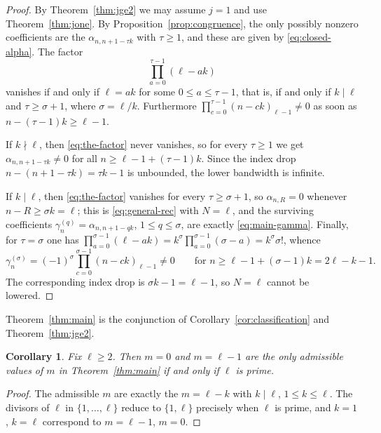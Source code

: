 \documentclass{amsart}
\newtheorem{corollary}[theorem]{Corollary}
\theoremstyle{definition}
\newcommand{\fall}[2]{(#1)_{#2}}
\begin{document}
\begin{proof}
By Theorem~\ref{thm:jge2} we may assume \(j=1\) and use
Theorem~\ref{thm:jone}.  By Proposition~\ref{prop:congruence}, the only
possibly nonzero coefficients are the \(\alpha_{n,n+1-\tau k}\) with
\(\tau\ge1\), and these are given by \eqref{eq:closed-alpha}.  The factor
\begin{equation}\label{eq:the-factor}
\prod_{a=0}^{\tau-1}(\ell-ak)
\end{equation}
vanishes if and only if \(\ell=ak\) for some \(0\le a\le\tau-1\), that is,
if and only if \(k\mid\ell\) and \(\tau\ge\sigma+1\), where
\(\sigma=\ell/k\).  Furthermore
\(\prod_{c=0}^{\tau-1}\fall{n-ck}{\ell-1}\ne0\) as soon as
\(n-(\tau-1)k\ge\ell-1\).

If \(k\nmid\ell\), then \eqref{eq:the-factor} never vanishes, so for every
\(\tau\ge1\) we get \(\alpha_{n,n+1-\tau k}\ne0\) for all
\(n\ge\ell-1+(\tau-1)k\).  Since the index drop \(n-(n+1-\tau k)=\tau k-1\)
is unbounded, the lower bandwidth is infinite.

If \(k\mid\ell\), then \eqref{eq:the-factor} vanishes for every
\(\tau\ge\sigma+1\), so \(\alpha_{n,R}=0\) whenever
\(n-R\ge\sigma k=\ell\); this is \eqref{eq:general-rec} with \(N=\ell\), and
the surviving coefficients \(\gamma^{(q)}_n=\alpha_{n,n+1-qk}\),
\(1\le q\le\sigma\), are exactly \eqref{eq:main-gamma}.  Finally, for
\(\tau=\sigma\) one has
\(\prod_{a=0}^{\sigma-1}(\ell-ak)=k^\sigma\prod_{a=0}^{\sigma-1}(\sigma-a)
=k^\sigma\sigma!\), whence
\[
\gamma_n^{(\sigma)}
=(-1)^\sigma\prod_{c=0}^{\sigma-1}\fall{n-ck}{\ell-1}\ne0
\qquad\text{for } n\ge\ell-1+(\sigma-1)k=2\ell-k-1 .
\]
The corresponding index drop is \(\sigma k-1=\ell-1\), so \(N=\ell\) cannot
be lowered.
\end{proof}

Theorem~\ref{thm:main} is the conjunction of
Corollary~\ref{cor:classification} and Theorem~\ref{thm:jge2}.

\begin{corollary}\label{cor:prime}
Fix \(\ell\ge2\).  Then \(m=0\) and \(m=\ell-1\) are the only admissible
values of \(m\) in Theorem~\ref{thm:main} if and only if \(\ell\) is prime.
\end{corollary}

\begin{proof}
The admissible \(m\) are exactly the \(m=\ell-k\) with \(k\mid\ell\),
\(1\le k\le\ell\).  The divisors of \(\ell\) in \(\{1,\dots,\ell\}\) reduce
to \(\{1,\ell\}\) precisely when \(\ell\) is prime, and \(k=1\), \(k=\ell\)
correspond to \(m=\ell-1\), \(m=0\).
\end{proof}
\end{document}
